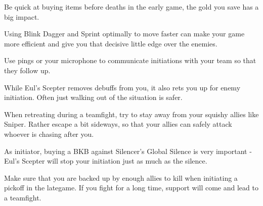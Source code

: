{
\item Be quick at buying items before deaths in the early game, the gold you save has a big impact.
\item Using Blink Dagger and Sprint optimally to move faster can make your game more efficient and give you that decisive little edge over the enemies.
\item Use pings or your microphone to communicate initiations with your team so that they follow up.
\item While Eul's Scepter removes debuffs from you, it also rets you up for enemy initiation. Often just walking out of the situation is safer.
\item When retreating during a teamfight, try to stay away from your squishy allies like Sniper. Rather escape a bit sideways, so that your allies can safely attack whoever is chasing after you.
\item As initiator, buying a BKB against Silencer's Global Silence is very important - Eul's Scepter will stop your initiation just as much as the silence.
\item Make sure that you are backed up by enough allies to kill when initiating a pickoff in the lategame. If you fight for a long time, support will come and lead to a teamfight.
}


